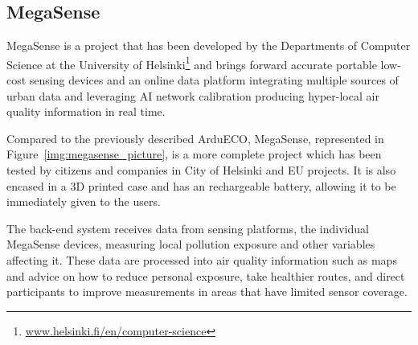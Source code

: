 		\subsection{MegaSense}\label{subsec:megasense}
	
	
		
			MegaSense is a project that has been developed by the Departments of Computer Science at the University of Helsinki\footnote{ \url{www.helsinki.fi/en/computer-science}} and brings forward accurate portable low-cost sensing devices and an online data platform integrating multiple sources of urban data and leveraging AI network calibration producing hyper-local air quality information in real time.
				
			Compared to the previously described ArduECO, MegaSense, represented in Figure~\ref{img:megasense_picture}, is a more complete project which has been tested by citizens and companies in City of Helsinki and EU projects.
			It is also encased in a $3$D printed case and has an rechargeable battery, allowing it to be immediately given to the users.

			The back-end system receives data from sensing platforms, the individual MegaSense devices, measuring local pollution exposure and other variables affecting it.
			These data are processed into air quality information such as maps and advice on how to reduce personal exposure, take healthier routes, and direct participants to improve measurements in areas that have limited sensor coverage.
			

